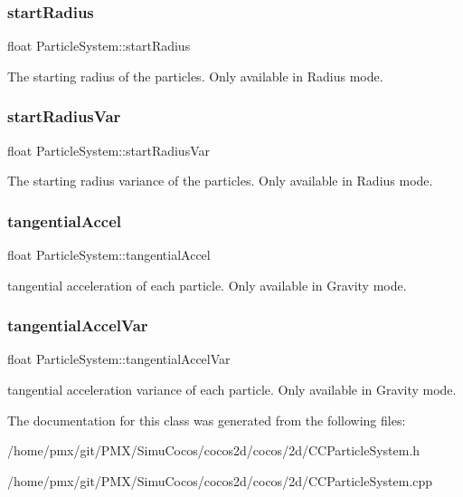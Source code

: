 \subsubsection{\texorpdfstring{start\+Radius}{startRadius}}
{\footnotesize\ttfamily float Particle\+System\+::start\+Radius}

The starting radius of the particles. Only available in \textquotesingle{}Radius\textquotesingle{} mode. \mbox{\label{classParticleSystem_a6144edbe628515ebe32c57c2c67e35cc}} 
\subsubsection{\texorpdfstring{start\+Radius\+Var}{startRadiusVar}}
{\footnotesize\ttfamily float Particle\+System\+::start\+Radius\+Var}

The starting radius variance of the particles. Only available in \textquotesingle{}Radius\textquotesingle{} mode. \mbox{\label{classParticleSystem_a64fc03277893b0fa596fa69e692c5688}} 
\subsubsection{\texorpdfstring{tangential\+Accel}{tangentialAccel}}
{\footnotesize\ttfamily float Particle\+System\+::tangential\+Accel}

tangential acceleration of each particle. Only available in \textquotesingle{}Gravity\textquotesingle{} mode. \mbox{\label{classParticleSystem_a75e4c8029b3b28e0d06e746f0e9562ae}} 
\subsubsection{\texorpdfstring{tangential\+Accel\+Var}{tangentialAccelVar}}
{\footnotesize\ttfamily float Particle\+System\+::tangential\+Accel\+Var}

tangential acceleration variance of each particle. Only available in \textquotesingle{}Gravity\textquotesingle{} mode. 

The documentation for this class was generated from the following files\+:\begin{DoxyCompactItemize}
\item 
/home/pmx/git/\+P\+M\+X/\+Simu\+Cocos/cocos2d/cocos/2d/C\+C\+Particle\+System.\+h\item 
/home/pmx/git/\+P\+M\+X/\+Simu\+Cocos/cocos2d/cocos/2d/C\+C\+Particle\+System.\+cpp\end{DoxyCompactItemize}
